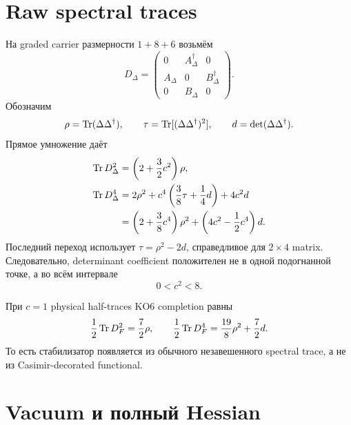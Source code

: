\section{Raw spectral traces}

На graded carrier размерности \(1+8+6\) возьмём
\begin{equation}
 D_\Delta=
 \begin{pmatrix}
 0&A_\Delta^\dagger&0\\
 A_\Delta&0&B_\Delta^\dagger\\
 0&B_\Delta&0
 \end{pmatrix}.
 \label{eq:ps-three-node-dirac}
\end{equation}
Обозначим
\begin{equation}
 \rho=\operatorname{Tr}(\Delta\Delta^\dagger),\qquad
 \tau=\operatorname{Tr}[(\Delta\Delta^\dagger)^2],\qquad
 d=\det(\Delta\Delta^\dagger).
\end{equation}
Прямое умножение даёт
\begin{align}
 \operatorname{Tr} D_\Delta^2
 &=\left(2+\frac32c^2\right)\rho,\\
 \operatorname{Tr} D_\Delta^4
 &=2\rho^2+c^4\left(\frac38\tau+\frac14d\right)
   +4c^2d\\
 &=\left(2+\frac38c^4\right)\rho^2
   +\left(4c^2-\frac12c^4\right)d.
 \label{eq:ps-three-node-traces}
\end{align}
Последний переход использует \(\tau=\rho^2-2d\), справедливое для
\(2\times4\) matrix. Следовательно, determinant coefficient положителен не
в одной подогнанной точке, а во всём интервале
\begin{equation}
 \boxed{0<c^2<8.}
 \label{eq:ps-three-node-stability-window}
\end{equation}

При \(c=1\) physical half-traces KO6 completion равны
\begin{equation}
 \frac12\operatorname{Tr} D_F^2=\frac72\rho,
 \qquad
 \frac12\operatorname{Tr} D_F^4=\frac{19}{8}\rho^2+\frac72d.
 \label{eq:ps-three-node-canonical-traces}
\end{equation}
То есть стабилизатор появляется из обычного незавешенного spectral trace, а
не из Casimir-decorated functional.

\section{Vacuum и полный Hessian}

